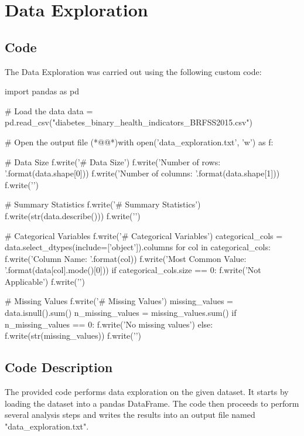 \documentclass[11pt]{article}
\begin{document}
\section{Data Exploration}
\subsection{{Code}}
The Data Exploration was carried out using the following custom code:

\begin{python}

import pandas as pd

# Load the data
data = pd.read_csv("diabetes_binary_health_indicators_BRFSS2015.csv")

# Open the output file
(*@@*)with open('data_exploration.txt', 'w') as f:

    # Data Size
    f.write('# Data Size\n')
    f.write('Number of rows: {}\n'.format(data.shape[0]))
    f.write('Number of columns: {}\n'.format(data.shape[1]))
    f.write('\n')

    # Summary Statistics
    f.write('# Summary Statistics\n')
    f.write(str(data.describe()))
    f.write('\n\n')

    # Categorical Variables
    f.write('# Categorical Variables\n')
    categorical_cols = data.select_dtypes(include=['object']).columns
    for col in categorical_cols:
        f.write('Column Name: {}\n'.format(col))
        f.write('Most Common Value: {}\n'.format(data[col].mode()[0]))
    if categorical_cols.size == 0:
        f.write('Not Applicable\n')
    f.write('\n')

    # Missing Values
    f.write('# Missing Values\n')
    missing_values = data.isnull().sum()
    n_missing_values = missing_values.sum()
    if n_missing_values == 0:
        f.write('No missing values')
    else:
        f.write(str(missing_values))
    f.write('\n\n')

\end{python}

\subsection{Code Description}

The provided code performs data exploration on the given dataset. It starts by loading the dataset into a pandas DataFrame. The code then proceeds to perform several analysis steps and writes the results into an output file named "data\_exploration.txt".
\end{document}
